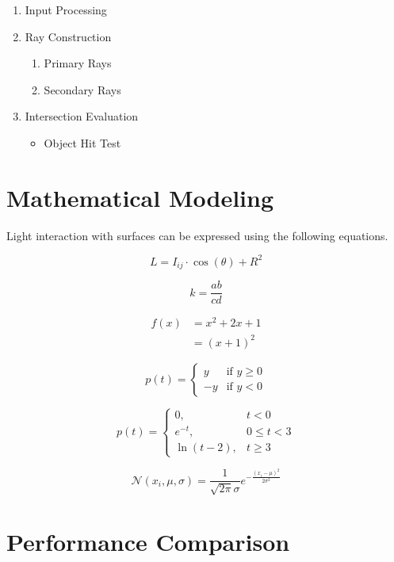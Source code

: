 \documentclass{article}
\begin{document}
\begin{enumerate}
    \item Input Processing
    \item Ray Construction
    \begin{enumerate}
        \item Primary Rays
        \item Secondary Rays
    \end{enumerate}
    \item Intersection Evaluation
    \begin{itemize}
        \item Object Hit Test
    \end{itemize}
\end{enumerate}

\section{Mathematical Modeling}

Light interaction with surfaces can be expressed using the following equations.

\[L = I_{ij} \cdot \cos \left( \theta \right) + R^2 \tag{1}\]

\[k = \frac{ab}{cd}\]


\begin{align*}
    f(x) &= x^2 + 2x + 1 \\
    &= (x + 1)^2 \tag{2}
\end{align*}

\[
p(t) = \begin{cases*}
    y & \text{if } y \geq 0 \\
    -y & \text{if } y < 0
\end{cases*}
\]

\[
p(t) = \begin{cases*}
    0, & t < 0 \\
    e^{-t}, & 0 \leq t < 3 \\
    \ln(t - 2), & t \geq 3
\end{cases*}
\]

\[
    \mathcal{N}(x_i, \mu, \sigma) = \frac{1}{\sqrt{2\pi}\sigma} e^{-\frac{(x_i - \mu)^2}{2\sigma^2}}
\]

\section{Performance Comparison}
\end{document}
